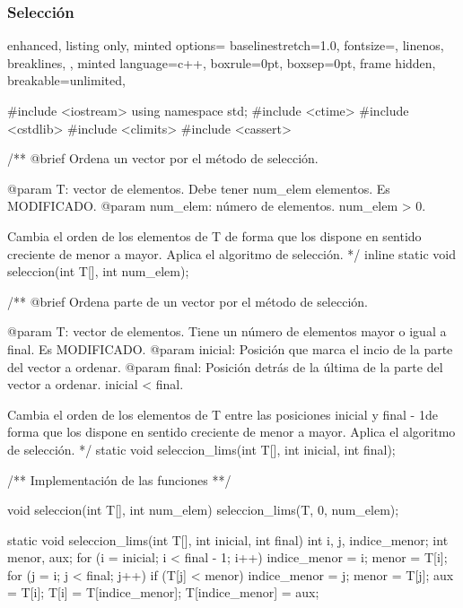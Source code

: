 \documentclass[12pt,spanish]{article}
\begin{document}
\subsubsection{Selección}
\begin{multicols}{2}
\begin{tcblisting}
{
  enhanced,
  listing only,
  minted options={
    baselinestretch=1.0,
    fontsize=\footnotesize,
    linenos,
    breaklines,
  },
  minted language=c++,
  boxrule=0pt,
  boxsep=0pt,
  frame hidden,
  breakable=unlimited,
}

#include <iostream>
using namespace std;
#include <ctime>
#include <cstdlib>
#include <climits>
#include <cassert>

/**
   @brief Ordena un vector por el método de selección.

   @param T: vector de elementos. Debe tener num_elem elementos.
             Es MODIFICADO.
   @param num_elem: número de elementos. num_elem > 0.

   Cambia el orden de los elementos de T de forma que los dispone
   en sentido creciente de menor a mayor.
   Aplica el algoritmo de selección.
*/
inline static 
void seleccion(int T[], int num_elem);

/**
   @brief Ordena parte de un vector por el método de selección.

   @param T: vector de elementos. Tiene un número de elementos 
                   mayor o igual a final. Es MODIFICADO.
   @param inicial: Posición que marca el incio de la parte del
                   vector a ordenar.
   @param final: Posición detrás de la última de la parte del
                   vector a ordenar. 
		   inicial < final.

   Cambia el orden de los elementos de T entre las posiciones
   inicial y final - 1de forma que los dispone en sentido creciente
   de menor a mayor.
   Aplica el algoritmo de selección.
*/
static void seleccion_lims(int T[], int inicial, int final);

/**
   Implementación de las funciones
**/

void seleccion(int T[], int num_elem)
{
  seleccion_lims(T, 0, num_elem);
}

static void seleccion_lims(int T[], int inicial, int final)
{
  int i, j, indice_menor;
  int menor, aux;
  for (i = inicial; i < final - 1; i++) {
    indice_menor = i;
    menor = T[i];
    for (j = i; j < final; j++)
      if (T[j] < menor) {
	indice_menor = j;
	menor = T[j];
      }
    aux = T[i];
    T[i] = T[indice_menor];
    T[indice_menor] = aux;
  }
}


\end{tcblisting}
\end{multicols}
\end{document}
